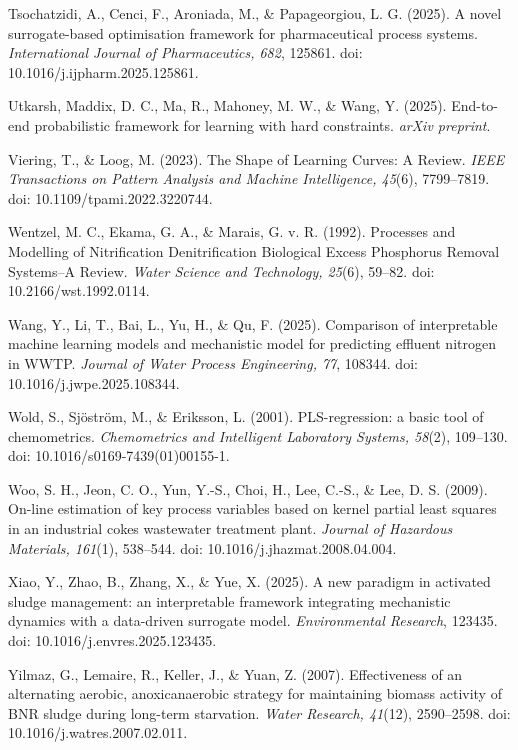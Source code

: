 \documentclass[a4paper,fleqn]{cas-sc}
\begin{document}
\noindent Tsochatzidi, A., Cenci, F., Aroniada, M., \& Papageorgiou, L. G. (2025). A novel surrogate-based optimisation framework for pharmaceutical process systems. \textit{International Journal of Pharmaceutics, 682}, 125861. doi: 10.1016/j.ijpharm.2025.125861.

\noindent Utkarsh, Maddix, D. C., Ma, R., Mahoney, M. W., \& Wang, Y. (2025). End-to-end probabilistic framework for learning with hard constraints. \textit{arXiv preprint}.

\noindent Viering, T., \& Loog, M. (2023). The Shape of Learning Curves: A Review. \textit{IEEE Transactions on Pattern Analysis and Machine Intelligence, 45}(6), 7799--7819. doi: 10.1109/tpami.2022.3220744.

\noindent Wentzel, M. C., Ekama, G. A., \& Marais, G. v. R. (1992). Processes and Modelling of Nitrification Denitrification Biological Excess Phosphorus Removal Systems--A Review. \textit{Water Science and Technology, 25}(6), 59--82. doi: 10.2166/wst.1992.0114.

\noindent Wang, Y., Li, T., Bai, L., Yu, H., \& Qu, F. (2025). Comparison of interpretable machine learning models and mechanistic model for predicting effluent nitrogen in WWTP. \textit{Journal of Water Process Engineering, 77}, 108344. doi: 10.1016/j.jwpe.2025.108344.

\noindent Wold, S., Sj\"ostr\"om, M., \& Eriksson, L. (2001). PLS-regression: a basic tool of chemometrics. \textit{Chemometrics and Intelligent Laboratory Systems, 58}(2), 109--130. doi: 10.1016/s0169-7439(01)00155-1.

\noindent Woo, S. H., Jeon, C. O., Yun, Y.-S., Choi, H., Lee, C.-S., \& Lee, D. S. (2009). On-line estimation of key process variables based on kernel partial least squares in an industrial cokes wastewater treatment plant. \textit{Journal of Hazardous Materials, 161}(1), 538--544. doi: 10.1016/j.jhazmat.2008.04.004.

\noindent Xiao, Y., Zhao, B., Zhang, X., \& Yue, X. (2025). A new paradigm in activated sludge management: an interpretable framework integrating mechanistic dynamics with a data-driven surrogate model. \textit{Environmental Research}, 123435. doi: 10.1016/j.envres.2025.123435.

\noindent Yilmaz, G., Lemaire, R., Keller, J., \& Yuan, Z. (2007). Effectiveness of an alternating aerobic, anoxic\/anaerobic strategy for maintaining biomass activity of BNR sludge during long-term starvation. \textit{Water Research, 41}(12), 2590--2598. doi: 10.1016/j.watres.2007.02.011.
\end{document}
